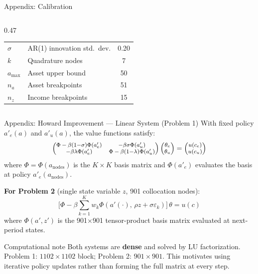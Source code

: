 \documentclass[aspectratio=169,11pt]{beamer}
\begin{document}
\begin{frame}{Appendix: Calibration}
\begin{columns}[T]
\begin{column}{0.47\textwidth}
\begin{tabular}{llc}
                $\sigma$ & AR(1) innovation std.\ dev. & 0.20 \\
                $k$ & Quadrature nodes & 7 \\
                $a_{\max}$ & Asset upper bound & 50 \\
                $n_a$ & Asset breakpoints & 51 \\
                $n_z$ & Income breakpoints & 15 \\
                \bottomrule
            \end{tabular}
        \end{column}
    \end{columns}
\end{frame}

\begin{frame}{Appendix: Howard Improvement --- Linear System (Problem 1)}
    \small
    With fixed policy $a'_e(a)$ and $a'_u(a)$, the value functions satisfy:
    \[
    \footnotesize
    \begin{pmatrix}
    \Phi - \beta(1{-}\sigma)\Phi(a'_e) & -\beta\sigma\Phi(a'_u) \\
    -\beta\lambda\Phi(a'_e) & \Phi - \beta(1{-}\lambda)\Phi(a'_u)
    \end{pmatrix}
    \begin{pmatrix}
    \theta_e \\ \theta_u
    \end{pmatrix}
    =
    \begin{pmatrix}
    u(c_e) \\ u(c_u)
    \end{pmatrix}
    \]
    where $\Phi = \Phi(a_{\text{nodes}})$ is the $K\!\times\!K$ basis matrix and $\Phi(a'_e)$ evaluates the basis at policy $a'_e(a_{\text{nodes}})$.

    \vspace{0.4em}
    \textbf{For Problem 2} (single state variable $z$, 901 collocation nodes):
    \[
    \bigl[\Phi - \beta\textstyle\sum_{k=1}^K w_k \Phi(a'(\cdot),\,\rho z + \sigma\varepsilon_k)\bigr]\,\theta = u(c)
    \]
    where $\Phi(a',z')$ is the 901$\times$901 tensor-product basis matrix evaluated at next-period states.

    \vspace{0.3em}
    \begin{block}{Computational note}
        Both systems are \textbf{dense} and solved by LU factorization. Problem 1: $1102\!\times\!1102$ block; Problem 2: $901\!\times\!901$. This motivates using iterative policy updates rather than forming the full matrix at every step.
    \end{block}
\end{frame}
\end{document}
